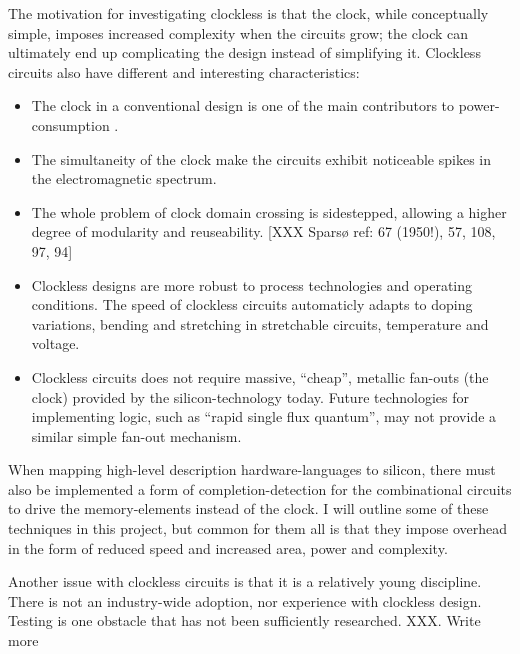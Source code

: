 The motivation for investigating clockless is that the clock, while
conceptually simple, imposes increased complexity when the circuits
grow; the clock can ultimately end up complicating the design instead
of simplifying it. Clockless circuits also have different and
interesting characteristics: \begin{itemize}

\item The clock in a conventional design is one of the main
  contributors to power-consumption \cite{tiwari1998reducing}.

\item The simultaneity of the clock make the circuits exhibit
  noticeable spikes in the electromagnetic spectrum.

\item The whole problem of clock domain crossing is sidestepped,
  allowing a higher degree of modularity and reuseability. [XXX Sparsø
    ref: 67 (1950!), 57, 108, 97, 94]

\item Clockless designs are more robust to process technologies and
  operating conditions. The speed of clockless circuits automaticly
  adapts to doping variations, bending and stretching in stretchable
  circuits, temperature and voltage.

\item Clockless circuits does not require massive, ``cheap'', metallic
  fan-outs (the clock) provided by the silicon-technology today. Future
  technologies for implementing logic, such as ``rapid single flux
  quantum'', may not provide a similar simple fan-out mechanism.
\end{itemize}

When mapping high-level description hardware-languages to silicon,
there must also be implemented a form of completion-detection for the
combinational circuits to drive the memory-elements instead of the
clock. I will outline some of these techniques in this project, but
common for them all is that they impose overhead in the form of
reduced speed and increased area, power and complexity.

Another issue with clockless circuits is that it is a relatively young
discipline. There is not an industry-wide adoption, nor experience
with clockless design. Testing is one obstacle that has not been
sufficiently researched. XXX. Write more
